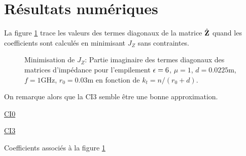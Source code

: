 \section{Résultats numériques}

  La figure \ref{fig:imp_fourier:sphere:hoppe:62:hoibc:mode_2} trace les valeurs des termes diagonaux de la matrice \(\hat{\mathbf{Z}}\) quand les coefficients sont calculés en minimisant \(J_Z\) sans contraintes.
  \begin{figure}[!hbt]
    \centering
    
    \caption[CIOE sur empilement de Hoppe & Rahmat-Samii p.~62]{Minimisation de \(J_Z\): Partie imaginaire des termes diagonaux des matrices d'impédance pour l'empilement \(\epsilon = 6\), \(\mu = 1\), \(d=0.0225\text{m}\), \(f=1\text{GHz}\), \(r_0=0.03\text{m}\) en fonction de \(k_t = n / (r_0+d)\).}
    \label{fig:imp_fourier:sphere:hoppe:62:hoibc:mode_2}
  \end{figure}
  On remarque alors que la CI3 semble être une bonne approximation. 

  \begin{table}[!hbt]
    \centering
    \begin{minipage}[t]{0.49\textwidth}
      \vspace{0pt}
      \centering
      \begin{coefftable}{\hyperlink{ci0}{CI0}}
        
      \end{coefftable}
    \end{minipage}
    \begin{minipage}[t]{0.49\textwidth}
      \vspace{0pt}
      \centering
      \begin{coefftable}{\hyperlink{ci3}{CI3}}
        
      \end{coefftable}
    \end{minipage}
    \caption{Coefficients associés à la figure \ref{fig:imp_fourier:sphere:hoppe:62:hoibc:mode_2}}
    \label{tab:imp_fourier:sphere:hoppe:62:hoibc:mode_2}
  \end{table}


